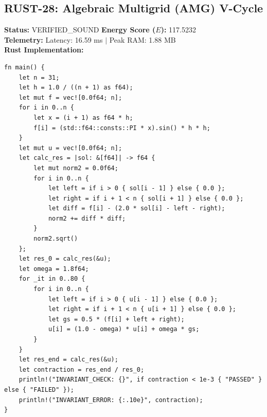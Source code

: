 \documentclass[11pt, a4paper]{article}
\begin{document}
\subsection{RUST-28: Algebraic Multigrid (AMG) V-Cycle}
\textbf{Status:} VERIFIED\_SOUND \hfill \textbf{Energy Score ($E$):} 117.5232\\
\textbf{Telemetry:} Latency: 16.59 ms $|$ Peak RAM: 1.88 MB\\
\textbf{Rust Implementation:}
\begin{verbatim}
fn main() {
    let n = 31;
    let h = 1.0 / ((n + 1) as f64);
    let mut f = vec![0.0f64; n];
    for i in 0..n {
        let x = (i + 1) as f64 * h;
        f[i] = (std::f64::consts::PI * x).sin() * h * h;
    }
    let mut u = vec![0.0f64; n];
    let calc_res = |sol: &[f64]| -> f64 {
        let mut norm2 = 0.0f64;
        for i in 0..n {
            let left = if i > 0 { sol[i - 1] } else { 0.0 };
            let right = if i + 1 < n { sol[i + 1] } else { 0.0 };
            let diff = f[i] - (2.0 * sol[i] - left - right);
            norm2 += diff * diff;
        }
        norm2.sqrt()
    };
    let res_0 = calc_res(&u);
    let omega = 1.8f64;
    for _it in 0..80 {
        for i in 0..n {
            let left = if i > 0 { u[i - 1] } else { 0.0 };
            let right = if i + 1 < n { u[i + 1] } else { 0.0 };
            let gs = 0.5 * (f[i] + left + right);
            u[i] = (1.0 - omega) * u[i] + omega * gs;
        }
    }
    let res_end = calc_res(&u);
    let contraction = res_end / res_0;
    println!("INVARIANT_CHECK: {}", if contraction < 1e-3 { "PASSED" } else { "FAILED" });
    println!("INVARIANT_ERROR: {:.10e}", contraction);
}
\end{verbatim}
\end{document}
